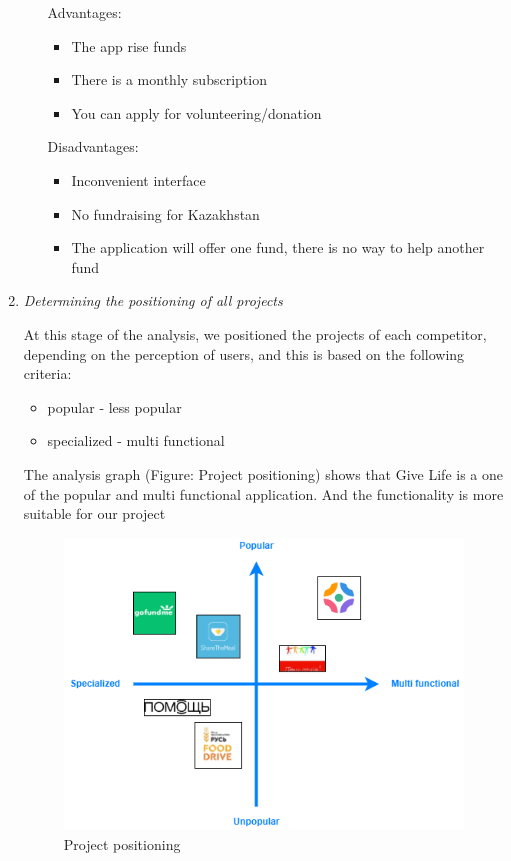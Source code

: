 \begin{enumerate}
\begin{itemize}
                Advantages:
                \begin{itemize}
                    \item The app rise funds
                    \item There is a monthly subscription
                    \item You can apply for volunteering/donation
                \end{itemize}
                Disadvantages:
                \begin{itemize}
                    \item Inconvenient interface
                    \item No fundraising for Kazakhstan
                    \item The application will offer one fund, there is no way to help another fund
                \end{itemize}
        \end{itemize}
        
        
        
    
    \item \textit{Determining the positioning of all projects} 
    
        At this stage of the analysis, we positioned the projects of each competitor, depending on the perception of users, and this is based on the following criteria:
        \begin{itemize}
            \item popular - less popular
            \item specialized - multi functional 
        \end{itemize}
        The analysis graph (Figure: Project positioning) shows that Give Life is a one of the popular and multi functional application. And the functionality is more suitable for our project
        
        \begin{figure}[h]
            \centering
            \includegraphics[width=16cm]{figures/Competitor analyze.png}
            \caption{Project positioning}
            \label{fig:1}
        \end{figure}
\end{enumerate}

